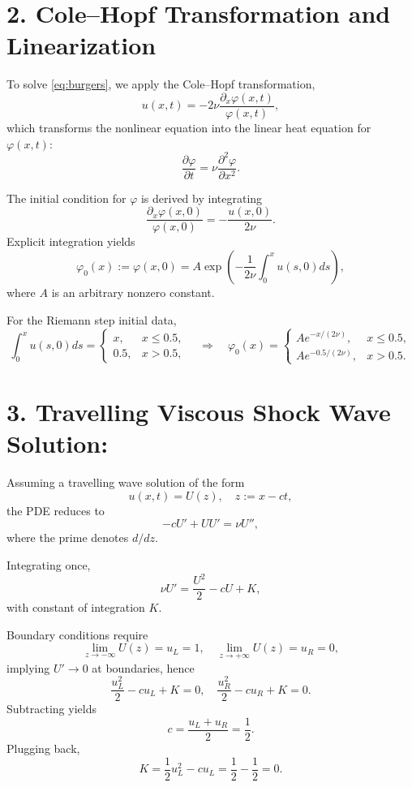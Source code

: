 \documentclass[12pt]{article}
\begin{document}
\vspace{20pt}

\section*{2. Cole--Hopf Transformation and Linearization}

To solve \eqref{eq:burgers}, we apply the Cole--Hopf transformation,
\[
u(x,t) = - 2 \nu \frac{\partial_x \varphi(x,t)}{\varphi(x,t)},
\]
which transforms the nonlinear equation into the linear heat equation for \(\varphi(x,t)\):
\[
\frac{\partial \varphi}{\partial t} = \nu \frac{\partial^2 \varphi}{\partial x^2}.
\]

The initial condition for \(\varphi\) is derived by integrating
\[
\frac{\partial_x \varphi(x,0)}{\varphi(x,0)} = -\frac{u(x,0)}{2 \nu}.
\]
Explicit integration yields
\[
\varphi_0(x) := \varphi(x,0) = A \exp\left(- \frac{1}{2 \nu} \int_0^x u(s,0) ds \right),
\]
where \(A\) is an arbitrary nonzero constant.

For the Riemann step initial data,
\[
\int_0^x u(s, 0) ds = \begin{cases}
x, & x \le 0.5, \\[6pt]
0.5, & x > 0.5,
\end{cases}
\quad \Rightarrow \quad
\varphi_0(x) = \begin{cases}
A e^{-x/(2 \nu)}, & x \le 0.5, \\[6pt]
A e^{-0.5/(2 \nu)}, & x > 0.5.
\end{cases}
\]

\vspace{20pt}

\section*{3. Travelling Viscous Shock Wave Solution:}

Assuming a travelling wave solution of the form
\[
u(x,t) = U(z), \quad z := x - c t,
\]
the PDE reduces to
\[
- c U' + U U' = \nu U'',
\]
where the prime denotes \(d/dz\).

Integrating once,
\[
\nu U' = \frac{U^2}{2} - c U + K,
\]
with constant of integration \(K\).

Boundary conditions require
\[
\lim_{z \to -\infty} U(z) = u_L = 1, \quad \lim_{z \to +\infty} U(z) = u_R = 0,
\]
implying \(U'\to 0\) at boundaries, hence
\[
\frac{u_L^2}{2} - c u_L + K = 0, \quad \frac{u_R^2}{2} - c u_R + K = 0.
\]
Subtracting yields
\[
c = \frac{u_L + u_R}{2} = \frac{1}{2}.
\]
Plugging back,
\[
K = \frac{1}{2} u_L^2 - c u_L = \frac{1}{2} - \frac{1}{2} = 0.
\]
\end{document}
